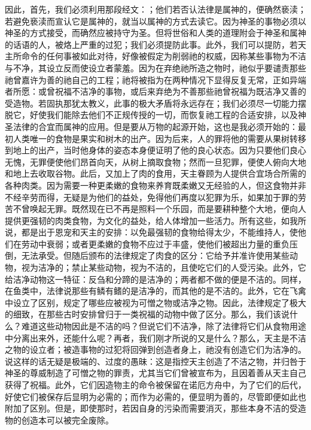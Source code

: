 因此，首先，我们必须利用那段经文：；他们若否认法律是属神的，便确然亵渎；若避免亵渎而宣认它是属神的，就当以属神的方式去读它。因为神圣的事物必须以神圣的方式接受，而确然应被持守为圣。但将世俗和人类的道理附会于神圣和属神的话语的人，被烙上严重的过犯；我们必须提防此事。此外，我们可以提防，若天主所命令的任何事被如此对待，好像被假定为削弱祂的权威，因称某些事物为不洁与不净，其设立反而使设立者蒙羞。因为在弃绝祂所造之物时，祂似乎要谴责那些祂曾嘉许为善的祂自己的工程；祂将被指为在两种情况下显得反复无常，正如异端者所愿：或曾祝福不洁净的事物，或后来弃绝为不善那些祂曾祝福为既洁净又善的受造物。若固执那犹太教义，此事的极大矛盾将永远存在；我们必须尽一切能力摆脱它，好使我们能除去他们不正规传授的一切，而恢复祂工程的合适安排，以及神圣法律的合宜而属神的应用。但是要从万物的起源开始，这也是我必须开始的：最初人类唯一的食物是果实和树木的出产。因为后来，人的罪将他的需要从果树转移到地上的出产，当时他身体的姿态本身便证明了他的良心状态。因为只要他们良心无愧，无罪便使他们昂首向天，从树上摘取食物；然而一旦犯罪，便使人俯向大地和地上去收取谷物。此后，又加上了肉的食用，天主眷顾为人提供合宜场合所需的各种肉类。因为需要一种更柔嫩的食物来养育既柔嫩又无经验的人，但这食物并非不经辛劳而得，无疑是为他们的益处，免得他们再度以犯罪为乐，如果加于罪的劳苦不曾唤起无罪。既然现在已不再是照料一个乐园，而是要耕种整个大地，便向人提供更强韧的肉类食物，为文化的益处，给人体增加一些活力。所有这些，如我所说，都是出于恩宠和天主的安排：以免最强韧的食物给得太少，不能维持人，使他们在劳动中衰弱；或者更柔嫩的食物不应过于丰盛，使他们被超出力量的重负压倒，无法承受。但随后颁布的法律规定了肉食的区分：它给予并准许使用某些动物，视为洁净的；禁止某些动物，视为不洁的，且使吃它们的人受污染。此外，它给洁净动物这一特征：反刍和分蹄的是洁净的；两者都不做的便是不洁的。同样，在鱼类中，法律说那些有鳞有鳍的是洁净的，而其他的是不洁的。此外，它在飞禽中设立了区别，规定了哪些应被视为可憎之物或洁净之物。因此，法律规定了极大的细致，在那些古时安排曾归于一类祝福的动物中做了区分。那么，我们该说什么？难道这些动物因此是不洁的吗？但说它们不洁净，除了法律将它们从食物用途中分离出来外，还能什么呢？再者，我们刚才所说的又是什么？那么，天主是不洁之物的设立者；被造事物的过犯将回弹到创造者身上，祂没有创造它们为洁净的。说这样的话无疑是极端的、过度的愚昧：这是指控天主创造了不洁之物，并归咎于神圣的尊威制造了可憎之物的罪责，尤其当它们曾被宣布为，且因着善从天主自己获得了祝福。此外，它们因造物主的命令被保留在诺厄方舟中，为了它们的后代，好使它们被保存后显明为必需的；而作为必需的，便显明为善的，尽管即便如此也附加了区别。但是，即使那时，若因自身的污染而需要消灭，那些本身不洁的受造物的创造本可以被完全废除。\par

